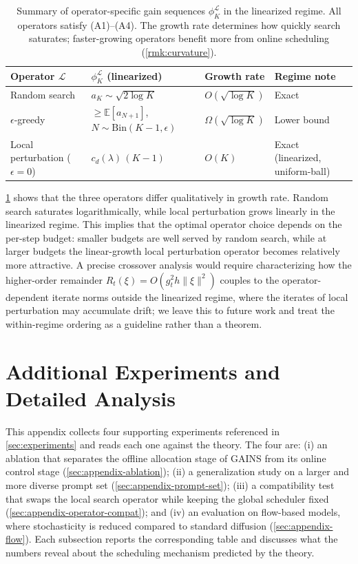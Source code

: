 %
\begin{table}[t]
\centering
\caption{Summary of operator-specific gain sequences $\phi_K^{\mathcal{L}}$ in the linearized regime. All operators satisfy (A1)--(A4). The growth rate determines how quickly search saturates; faster-growing operators benefit more from online scheduling (\cref{rmk:curvature}).}
\label{tab:phi-summary}
\small
\begin{tabular}{@{}llll@{}}
\toprule
Operator $\mathcal{L}$ & $\phi_K^{\mathcal{L}}$ (linearized) & Growth rate & Regime note \\
\midrule
Random search & $a_K \sim \sqrt{2\log K}$ & $O(\sqrt{\log K})$ & Exact \\
$\epsilon$-greedy & $\ge \mathbb{E}[a_{N+1}]$, $N{\sim}\mathrm{Bin}(K{-}1,\epsilon)$ & $\Omega(\sqrt{\log K})$ & Lower bound \\
Local perturbation ($\epsilon{=}0$) & $c_d(\lambda)\,(K-1)$ & $O(K)$ & Exact (linearized, uniform-ball) \\
\bottomrule
\end{tabular}
\end{table}
%
\cref{tab:phi-summary} shows that the three operators differ qualitatively in growth rate. Random search saturates logarithmically, while local perturbation grows linearly in the linearized regime. This implies that the optimal operator choice depends on the per-step budget: smaller budgets are well served by random search, while at larger budgets the linear-growth local perturbation operator becomes relatively more attractive. A precise crossover analysis would require characterizing how the higher-order remainder $R_t(\xi) = O(g_t^2 h \|\xi\|^2)$ couples to the operator-dependent iterate norms outside the linearized regime, where the iterates of local perturbation may accumulate drift; we leave this to future work and treat the within-regime ordering as a guideline rather than a theorem.
%
\section{Additional Experiments and Detailed Analysis}
\label{sec:appendix-experiments}
%
This appendix collects four supporting experiments referenced in \cref{sec:experiments} and reads each one against the theory. The four are: (i) an ablation that separates the offline allocation stage of \textsc{GAINS} from its online control stage (\cref{sec:appendix-ablation}); (ii) a generalization study on a larger and more diverse prompt set (\cref{sec:appendix-prompt-set}); (iii) a compatibility test that swaps the local search operator while keeping the global scheduler fixed (\cref{sec:appendix-operator-compat}); and (iv) an evaluation on flow-based models, where stochasticity is reduced compared to standard diffusion (\cref{sec:appendix-flow}). Each subsection reports the corresponding table and discusses what the numbers reveal about the scheduling mechanism predicted by the theory.
%
